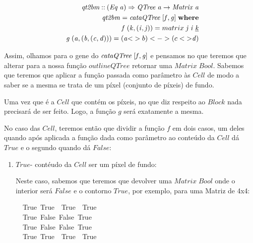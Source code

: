 \documentclass[a4paper]{article}
\newcommand{\Conid}[1]{\mathit{#1}}
\newcommand{\Varid}[1]{\mathit{#1}}
\begin{document}
\begin{enumerate}
\begin{eqnarray*}
\start
\ensuremath{\Varid{qt2bm}\mathbin{::}(\Conid{Eq}\;\Varid{a})\Rightarrow \Conid{QTree}\;\Varid{a}\to \Conid{Matrix}\;\Varid{a}}
\more
\ensuremath{\Varid{qt2bm}\mathrel{=}\Varid{cataQTree}\;\alt{\Varid{f}}{\Varid{g}}\;\mathbf{where}}
\more
\ensuremath{\Varid{f}\;(\Varid{k},(\Varid{i},\Varid{j}))\mathrel{=}matrix\;\Varid{j}\;\Varid{i}\;\underline{\Varid{k}}}
\more
\ensuremath{\Varid{g}\;(\Varid{a},(\Varid{b},(\Varid{c},\Varid{d})))\mathrel{=}(\Varid{a}\mathbin{<}}> b) <-> (c <\ensuremath{\mathbin{>}\Varid{d})}
\end{eqnarray*}

Assim, olhamos para o gene do \ensuremath{\Varid{cataQTree}\;\alt{\Varid{f}}{\Varid{g}}} e pensamos no que teremos
que alterar para a nossa função \ensuremath{\Varid{outlineQTree}} retornar uma \ensuremath{\Conid{Matrix}\;\Conid{Bool}}.
Sabemos que teremos que aplicar a função passada como parâmetro às \ensuremath{\Conid{Cell}}
de modo a saber se a mesma se trata de um píxel (conjunto de píxeis) de fundo.

Uma vez que é a \ensuremath{\Conid{Cell}} que contém os píxeis, no que diz respeito ao \ensuremath{\Conid{Block}}
nada precisará de ser feito. Logo, a função \ensuremath{\Varid{g}} será exatamente a mesma.

No caso das \ensuremath{\Conid{Cell}}, teremos então que dividir a função \ensuremath{\Varid{f}} em dois casos,
um deles quando após aplicada a função dada como parâmetro ao conteúdo da \ensuremath{\Conid{Cell}}
dá \ensuremath{\Conid{True}} e o segundo quando dá \ensuremath{\Conid{False}}:
\begin{enumerate}
\item \ensuremath{\Conid{True}}- contéudo da \ensuremath{\Conid{Cell}} ser um píxel de fundo:

Neste caso, sabemos que teremos que devolver uma \ensuremath{\Conid{Matrix}\;\Conid{Bool}} onde
o interior será \ensuremath{\Conid{False}} e o contorno \ensuremath{\Conid{True}}, por exemplo, para uma
Matriz de 4x4:
\begin{tabbing}\ttfamily
~~True~True~~True~~True~\\
\ttfamily ~~True~False~False~True~\\
\ttfamily ~~True~False~False~True~\\
\ttfamily ~~True~True~~True~~True~
\end{tabbing}


\end{enumerate}
\end{enumerate}
\end{document}
